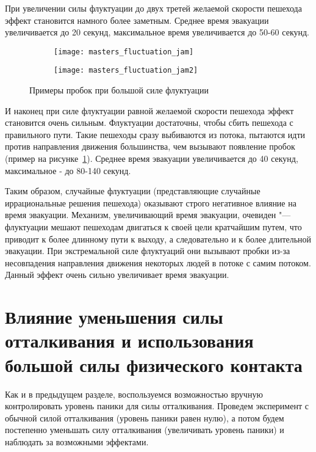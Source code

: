 При увеличении силы флуктуации до двух третей желаемой скорости пешехода эффект становится намного более заметным.
Среднее время эвакуации увеличивается до 20 секунд, максимальное время увеличивается до 50-60 секунд.

\begin{figure}[ht!]
  \centering
  \begin{subfigure}[!htb]{0.45\textwidth}
    \centering
    \texttt{[image: masters\_fluctuation\_jam]}
    \caption{}
  \end{subfigure}
  \begin{subfigure}[!htb]{0.45\textwidth}
    \centering
    \texttt{[image: masters\_fluctuation\_jam2]}
    \caption{}
  \end{subfigure}
  \caption{Примеры пробок при большой силе флуктуации}
  \label{sec:results:fluctuation:jam}
\end{figure}

И наконец при силе флуктуации равной желаемой скорости пешехода эффект становится очень сильным.
Флуктуации достаточны, чтобы сбить пешехода с правильного пути.
Такие пешеходы сразу выбиваются из потока, пытаются идти против направления движения большинства, чем вызывают появление пробок (пример на рисунке~\ref{sec:results:fluctuation:jam}).
Среднее время эвакуации увеличивается до 40 секунд, максимальное - до 80-140 секунд.

Таким образом, случайные флуктуации (представляющие случайные иррациональные решения пешехода) оказывают строго негативное влияние на время эвакуации.
Механизм, увеличивающий время эвакуации, очевиден "--- флуктуации мешают пешеходам двигаться к своей цели кратчайшим путем,
что приводит к более длинному пути к выходу, а следовательно и к более длительной эвакуации.
При экстремальной силе флуктуаций они вызывают пробки из-за несовпадения направления движения некоторых людей в потоке с самим потоком.
Данный эффект очень сильно увеличивает время эвакуации.

\section{Влияние уменьшения силы отталкивания и использования большой силы физического контакта}
\label{sec:results:repulsion}

Как и в предыдущем разделе, воспользуемся возможностью вручную контролировать уровень паники для силы отталкивания.
Проведем эксперимент с обычной силой отталкивания (уровень паники равен нулю), а потом будем постепенно уменьшать силу отталкивания (увеличивать уровень паники)
и наблюдать за возможными эффектами.

